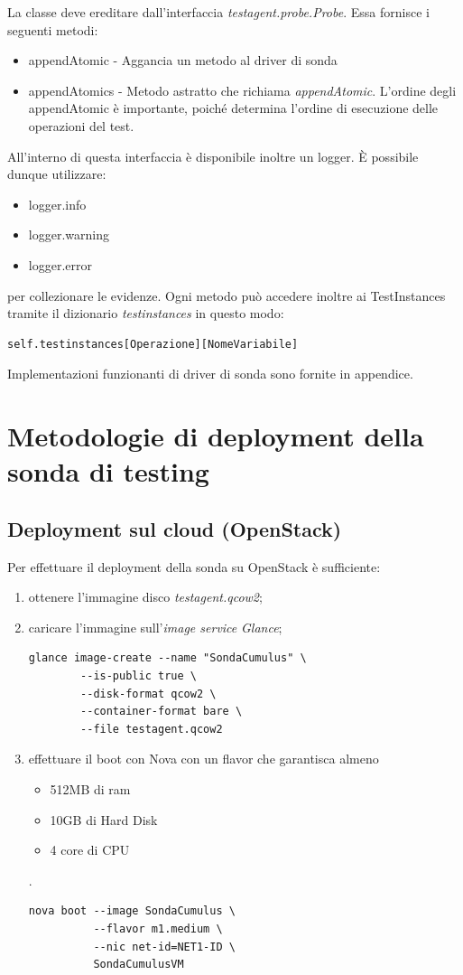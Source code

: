 \documentclass[../main.tex]{subfiles}
\begin{document}
La classe deve ereditare dall'interfaccia \textit{testagent.probe.Probe}. Essa fornisce i seguenti metodi:
\begin{itemize}
\item appendAtomic - Aggancia un metodo al driver di sonda
\item appendAtomics - Metodo astratto che richiama \textit{appendAtomic}. L'ordine degli appendAtomic è importante, poiché determina l'ordine di esecuzione delle operazioni del test.
\end{itemize}
All'interno di questa interfaccia è disponibile inoltre un logger. \`E possibile dunque utilizzare:
\begin{itemize}
\item logger.info
\item logger.warning
\item logger.error
\end{itemize}
per collezionare le evidenze.
Ogni metodo può accedere inoltre ai TestInstances tramite il dizionario \textit{testinstances} in questo modo:
\begin{Verbatim}
self.testinstances[Operazione][NomeVariabile]
\end{Verbatim}
Implementazioni funzionanti di driver di sonda sono fornite in appendice.

\section {Metodologie di deployment della sonda di testing}
\subsection {Deployment sul cloud (OpenStack)}
Per effettuare il deployment della sonda su OpenStack è sufficiente:
\begin{enumerate}
\item ottenere l'immagine disco \textit{testagent.qcow2};
\item caricare l'immagine sull'\textit{image service} \textit{Glance};
\begin{Verbatim}
glance image-create --name "SondaCumulus" \
        --is-public true \
        --disk-format qcow2 \
        --container-format bare \
        --file testagent.qcow2
\end{Verbatim}
\item effettuare il boot con Nova con un flavor che garantisca almeno
\begin{itemize}
\item 512MB di ram
\item 10GB di Hard Disk
\item 4 core di CPU
\end{itemize}.
\begin{Verbatim}
nova boot --image SondaCumulus \
          --flavor m1.medium \
          --nic net-id=NET1-ID \
          SondaCumulusVM
\end{Verbatim}
\end{enumerate}
\end{document}
